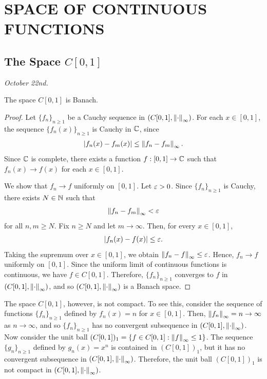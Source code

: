 \chapter{SPACE OF CONTINUOUS FUNCTIONS}

\section{The Space $C[0,1]$}

\textit{October 22nd.}

\begin{theorem}
    The space $C[0,1]$ is Banach.
\end{theorem}
\begin{proof}
    Let $\{f_{n}\}_{n \geq 1}$ be a Cauchy sequence in $(C[0,1],\left\lVert\cdot\right\rVert_{\infty})$. For each $x \in [0,1]$, the sequence $\{f_{n}(x)\}_{n \geq 1}$ is Cauchy in $\mathbb{C}$, since
    \begin{align}
        \left| f_{n}(x)-f_{m}(x) \right| \leq \left\lVert f_{n}-f_{m}\right\rVert_{\infty}.
    \end{align}
    Since $\mathbb{C}$ is complete, there exists a function $f:[0,1] \to \mathbb{C}$ such that $f_{n}(x) \to f(x)$ for each $x \in [0,1]$.

    We show that $f_{n} \to f$ uniformly on $[0,1]$. Let $\varepsilon > 0$. Since $\{f_{n}\}_{n \geq 1}$ is Cauchy, there exists $N \in \mathbb{N}$ such that
    \begin{align}
        \left\lVert f_{n}-f_{m}\right\rVert_{\infty} < \varepsilon
    \end{align}
    for all $n,m \geq N$. Fix $n \geq N$ and let $m \to \infty$. Then, for every $x \in [0,1]$,
    \begin{align}
        \left| f_{n}(x)-f(x) \right| \leq \varepsilon.
    \end{align}
    Taking the supremum over $x \in [0,1]$, we obtain $\left\lVert f_{n}-f\right\rVert_{\infty} \leq \varepsilon$. Hence, $f_{n} \to f$ uniformly on $[0,1]$. Since the uniform limit of continuous functions is continuous, we have $f \in C[0,1]$. Therefore, $\{f_{n}\}_{n \geq 1}$ converges to $f$ in $(C[0,1],\left\lVert\cdot\right\rVert_{\infty})$, and so $(C[0,1],\left\lVert\cdot\right\rVert_{\infty})$ is a Banach space.
\end{proof}

The space $C[0,1]$, however, is not compact. To see this, consider the sequence of functions $\{f_{n}\}_{n \geq 1}$ defined by $f_{n}(x) = n$ for $x \in [0,1]$. Then, $\left\lVert f_{n}\right\rVert_{\infty} = n \to \infty$ as $n \to \infty$, and so $\{f_{n}\}_{n \geq 1}$ has no convergent subsequence in $(C[0,1],\left\lVert\cdot\right\rVert_{\infty})$. Now consider the unit ball $(C[0,1])_{1} = \{f \in C[0,1] : \left\lVert f\right\rVert_{\infty} \leq 1\}$. The sequence $\{g_{n}\}_{n \geq 1}$ defined by $g_{n}(x) = x^{n}$ is contained in $(C[0,1])_{1}$, but it has no convergent subsequence in $(C[0,1],\left\lVert\cdot\right\rVert_{\infty})$. Therefore, the unit ball $(C[0,1])_{1}$ is not compact in $(C[0,1],\left\lVert\cdot\right\rVert_{\infty})$.

